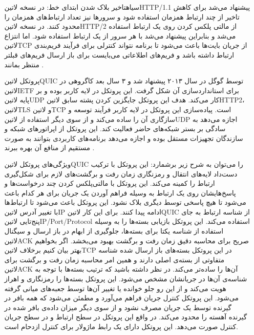 ‌سیاه{تاخیر بلاک شدن ابتدای خط}: در نسخه ‌لاتین{HTTP/1.1} پیشنهاد می‌شد برای کاهش تاخیر از چند ارتباط همزمان استفاده شود و سرورها نیز تعداد ارتباط‌های همزمان را محدود کنند.
در نسخه ‌لاتین{HTTP/2} از مالتی پلکس کردن روی یک ارتباط استفاده می‌شد و بنابراین پیشنهاد می‌شد با هر سرور از یک ارتباط استفاده شود.
اما انتزاع ‌لاتین{TCP} از جریان بایت‌ها باعث می‌شود تا برنامه نتواند کنترلی برای فرآیند فریم‌بندی ارتباط داشته باشد و فریم‌های اطلاعاتی می‌بایست برای باز ارسال فریم‌های قبلتر منتظر بمانند
.

پروتکل ‌لاتین{QUIC} توسط گوگل در سال ۲۰۱۳ پیشنهاد شد و ۳ سال بعد کاگروهی در ‌لاتین{IETF} برای استانداردسازی آن شکل گرفت. این پروتکل در لایه کاربر بوده و بر پایه ‌لاتین{UDP} کار می‌کند.
هدف این پروتکل جایگزین کردن پشته سابق ‌لاتین{HTTP2}، ‌لاتین{TLS} و ‌لاتین{TCP} است.
پیاده‌سازی این پروتکل در لایه کاربر فرآیند توسعه و سازگاری آن را ساده می‌کند و از سوی دیگر استفاده از ‌لاتین{UDP} اجازه می‌دهد به سادگی بر بستر شبکه‌های حاضر فعالیت کند.
این پروتکل از اپراتورهای شبکه و سازندگان تجهیزات مستقل بوده و اجازه می‌دهد برنامه‌های کاربردی بتوانند به صورت مستقیم از منافع آن بهره ببرند
.

ویژگی‌های پروتکل ‌لاتین{QUIC} را می‌توان به شرح زیر برشمارد:
 این پروتکل با ترکیب دست‌داد لایه‌های انتقال و رمزنگاری زمان رفت و برگشت‌های لازم برای شکل‌گیری ارتباط را کمینه می‌کند.
 این پروتکل با مالتی‌پلکس کردن چند درخواست‌ها و پاسخ‌هایشان روی یک ارتباط به وسیله فراهم آوردن یک جریان برای هر کدام باعث می‌شود تا هیچ پاسخی توسط دیگری بلاک نشود.
 این پروتکل باعث می‌شود تا ارتباط‌ها با تغییر آدرس ‌لاتین{IP} ادامه پیدا کنند. برای این کار ‌لاتین{QUIC} از شناسه ارتباط به جای پنج‌تایی ‌لاتین{IP/Port/Protocol} استفاده می‌کند.
 این پروتکل بازیابی بسته‌ها را به وسیله استفاده از شناسه یکتا برای بسته‌ها، جلوگیری از ابهام در باز ارسال و سیگنال ‌لاتین{ACK} صریح برای محاسبه دقیق زمان رفت و برگشت بهبود می‌بخشد. اگر بخواهیم بهتر بیان کنیم برخلاف ‌لاتین{TCP} در این پروتکل
بسته‌های باز ارسال شده شناسه متفاوتی از بسته‌ی اصلی دارند و همین امر محاسبه زمان رفت و برگشت برای ‌لاتین{ACK} آن‌ها را ساده‌تر می‌کند. در نظر داشته باشید که ترتیب بسته‌ها با توجه به شناسه‌ی آن‌ها در جریانشان مشخص می‌شود.
 این پروتکل بسته‌ها را رمزنگاری و اهراز هویت می‌کند و از این رو جلو خوانده یا تغییر آن‌ها توسط جعبه‌های میانی گرفته می‌شود.
 این پروتکل کنترل جریان فراهم می‌آورد و مطمئن می‌شود که همه بافر در گیرنده توسط یک جریان مصرف نشود و از سوی دیگر میزان داده‌ی بافر شده در گیرنده آهسته را محدود می‌کند. در واقع این پروتکل در سطح ارتباط و در سطح جریان کنترل صورت می‌دهد.
 این پروتکل دارای یک رابط ماژولار برای کنترل ازدحام است.

